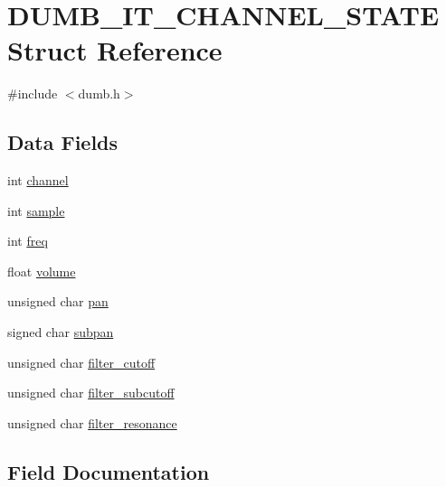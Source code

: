 \hypertarget{struct_d_u_m_b___i_t___c_h_a_n_n_e_l___s_t_a_t_e}{}\section{D\+U\+M\+B\+\_\+\+I\+T\+\_\+\+C\+H\+A\+N\+N\+E\+L\+\_\+\+S\+T\+A\+TE Struct Reference}
\label{struct_d_u_m_b___i_t___c_h_a_n_n_e_l___s_t_a_t_e}


{\ttfamily \#include $<$dumb.\+h$>$}

\subsection*{Data Fields}
\begin{DoxyCompactItemize}
\item 
int \hyperlink{struct_d_u_m_b___i_t___c_h_a_n_n_e_l___s_t_a_t_e_a3b60d129cd04aecb5bed36b264ebeca0}{channel}
\item 
int \hyperlink{struct_d_u_m_b___i_t___c_h_a_n_n_e_l___s_t_a_t_e_ab521fab036853b5decfc56aaf115d6ba}{sample}
\item 
int \hyperlink{struct_d_u_m_b___i_t___c_h_a_n_n_e_l___s_t_a_t_e_a6edfd78597d09d59bd7ab164199960d2}{freq}
\item 
float \hyperlink{struct_d_u_m_b___i_t___c_h_a_n_n_e_l___s_t_a_t_e_abb7e011c66537589d7ea8a79274f5fc6}{volume}
\item 
unsigned char \hyperlink{struct_d_u_m_b___i_t___c_h_a_n_n_e_l___s_t_a_t_e_aa58f93266e2691c28cd47e8a5a20a61e}{pan}
\item 
signed char \hyperlink{struct_d_u_m_b___i_t___c_h_a_n_n_e_l___s_t_a_t_e_a9101cbcba1624e54effad0d3f465842f}{subpan}
\item 
unsigned char \hyperlink{struct_d_u_m_b___i_t___c_h_a_n_n_e_l___s_t_a_t_e_ab2a1215a49359e52d5933b721aadbc1a}{filter\+\_\+cutoff}
\item 
unsigned char \hyperlink{struct_d_u_m_b___i_t___c_h_a_n_n_e_l___s_t_a_t_e_a6bbd69d8451654cca2695802abc76ee9}{filter\+\_\+subcutoff}
\item 
unsigned char \hyperlink{struct_d_u_m_b___i_t___c_h_a_n_n_e_l___s_t_a_t_e_a3df84d45b7c51b218ff7038064e526cb}{filter\+\_\+resonance}
\end{DoxyCompactItemize}


\subsection{Field Documentation}
\mbox{\label{struct_d_u_m_b___i_t___c_h_a_n_n_e_l___s_t_a_t_e_a3b60d129cd04aecb5bed36b264ebeca0}} 
